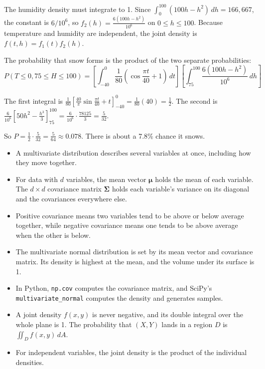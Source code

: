 \begin{Answer}[ref = snow]
The humidity density must integrate to 1. Since $\int_0^{100}(100h - h^2)\,dh = 166{,}667$, the constant is $6/10^6$, so $f_2(h) = \frac{6(100h-h^2)}{10^6}$ on $0 \leq h \leq 100$. Because temperature and humidity are independent, the joint density is $f(t, h) = f_1(t)f_2(h)$.

The probability that snow forms is the product of the two separate probabilities:
$$P(T \leq 0, 75 \leq H \leq 100) = \left[\int_{-40}^{0} \frac{1}{80}\left(\cos{\frac{\pi t}{40}} + 1\right)\,dt\right]\left[\int_{75}^{100} \frac{6(100h - h^2)}{10^6}\,dh\right]$$

The first integral is $\frac{1}{80}\left[\frac{40}{\pi}\sin{\frac{\pi t}{40}} + t\right]_{-40}^{0} = \frac{1}{80}(40) = \frac{1}{2}$. The second is $\frac{6}{10^6}\left[50h^2 - \frac{h^3}{3}\right]_{75}^{100} = \frac{6}{10^6}\cdot\frac{78125}{3} = \frac{5}{32}$.

So $P = \frac{1}{2}\cdot\frac{5}{32} = \frac{5}{64} \approx 0.078$. There is about a 7.8\% chance it snows.
\end{Answer}

\begin{mdframed}[style=important, frametitle={Key Ideas}]
\begin{itemize}
\item A multivariate distribution describes several variables at once, including how they move together.
\item For data with $d$ variables, the mean vector $\boldsymbol\mu$ holds the mean of each variable. The $d \times d$ covariance matrix $\mathbf{\Sigma}$ holds each variable's variance on its diagonal and the covariances everywhere else.
\item Positive covariance means two variables tend to be above or below average together, while negative covariance means one tends to be above average when the other is below.
\item The multivariate normal distribution is set by its mean vector and covariance matrix. Its density is highest at the mean, and the volume under its surface is 1.
\item In Python, \texttt{np.cov} computes the covariance matrix, and SciPy's \texttt{multivariate\_normal} computes the density and generates samples.
\item A joint density $f(x, y)$ is never negative, and its double integral over the whole plane is 1. The probability that $(X, Y)$ lands in a region $D$ is $\iint_D f(x, y)\,dA$.
\item For independent variables, the joint density is the product of the individual densities.
\end{itemize}
\end{mdframed}
